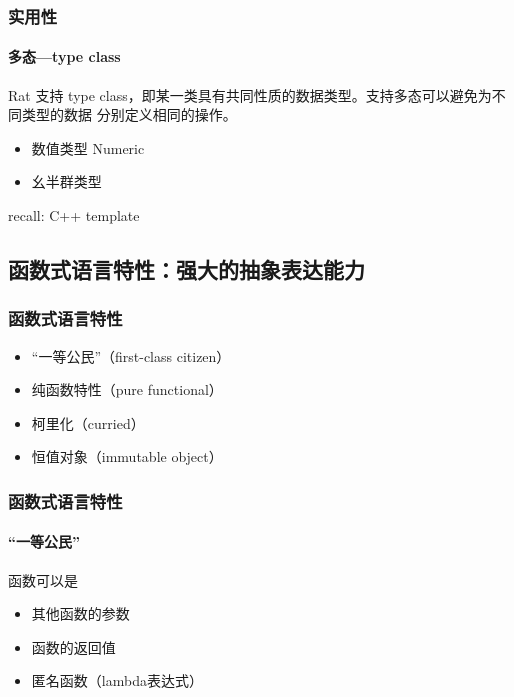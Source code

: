 \documentclass{beamer}
\begin{document}
\begin{frame}
  \frametitle{实用性}
  \framesubtitle{多态---type class}
  Rat 支持 type class，即某一类具有共同性质的数据类型。支持多态可以避免为不同类型的数据
  分别定义相同的操作。
  \begin{itemize}
    \item 数值类型 Numeric
      
    \item 幺半群类型
      
  \end{itemize}
  \pause
  recall: C++ template
  
\end{frame}


\subsection{函数式语言特性：强大的抽象表达能力}
\begin{frame}
  \frametitle{函数式语言特性}
  \begin{itemize}
    \item “一等公民”（first-class citizen）
    \item 纯函数特性（pure functional）
    \item 柯里化（curried）
    \item 恒值对象（immutable object）
  \end{itemize}
\end{frame}

\begin{frame}
  \frametitle{函数式语言特性}
  \framesubtitle{“一等公民”}
  函数可以是
  \begin{itemize}
    \item<1-> 其他函数的参数
      
    \item<2-> 函数的返回值\\
      
    \item<3-> 匿名函数（lambda表达式）\\
      
  \end{itemize}
\end{frame}
\end{document}
